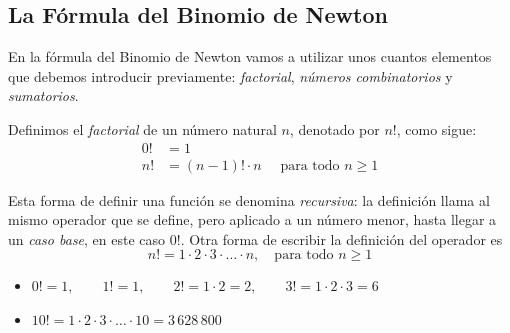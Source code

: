 \subsection{La Fórmula del Binomio de Newton}

En la fórmula del Binomio de Newton vamos a utilizar unos cuantos elementos que debemos introducir previamente: \emph{factorial}, \emph{números combinatorios} y \emph{sumatorios}.
%
\begin{definicion}[Factorial]
Definimos el \emph{factorial} de un número natural $n$, denotado por $n!$, como sigue:
%
\begin{align*}
0! &= 1 \\
n! &= (n-1)!\cdot n\quad \mbox{ para todo } n\ge 1
\end{align*}
%
\end{definicion}
%
Esta forma de definir una función se denomina \emph{recursiva}:
la definición llama al mismo operador que se define, pero aplicado a un número menor, hasta llegar a un \emph{caso base}, en este caso $0!$.
Otra forma de escribir la definición del operador es
\[
n! = 1\cdot 2\cdot 3\cdot \ldots \cdot n,\quad\text{para todo } n\ge1
\]
%
\begin{ejemplo-br}
\begin{itemize}
\item[]
$0! = 1,\qquad 1!=1,\qquad 2!=1\cdot 2=2,
\qquad 3!=1\cdot 2\cdot 3 = 6 $ 
\item[] $10!=1\cdot 2\cdot 3\cdot \ldots\cdot 10 = 3\,628\,800$\fej
\end{itemize}
\end{ejemplo-br}

